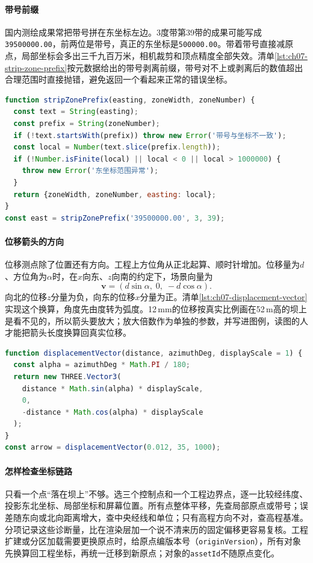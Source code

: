 \paragraph{带号前缀}国内测绘成果常把带号拼在东坐标左边。3度带第39带的成果可能写成\texttt{39500000.00}，前两位是带号，真正的东坐标是\texttt{500000.00}。带着带号直接减原点，局部坐标会多出三千九百万米，相机裁剪和顶点精度全部失效。清单\ref{lst:ch07-strip-zone-prefix}按元数据给出的带号剥离前缀，带号对不上或剥离后的数值超出合理范围时直接抛错，避免返回一个看起来正常的错误坐标。

\begin{lstlisting}[label={lst:ch07-strip-zone-prefix},language=JavaScript,breaklines=true,caption={剥离国内测绘成果的带号前缀}]
function stripZonePrefix(easting, zoneWidth, zoneNumber) {
  const text = String(easting);
  const prefix = String(zoneNumber);
  if (!text.startsWith(prefix)) throw new Error('带号与坐标不一致');
  const local = Number(text.slice(prefix.length));
  if (!Number.isFinite(local) || local < 0 || local > 1000000) {
    throw new Error('东坐标范围异常');
  }
  return {zoneWidth, zoneNumber, easting: local};
}
const east = stripZonePrefix('39500000.00', 3, 39);
\end{lstlisting}

\paragraph{位移箭头的方向}位移测点除了位置还有方向。工程上方位角从正北起算、顺时针增加。位移量为$d$、方位角为$\alpha$时，在$x$向东、$z$向南的约定下，场景向量为
\[
  \boldsymbol v=(d\sin\alpha,\;0,\;-d\cos\alpha).
\]
向北的位移$z$分量为负，向东的位移$x$分量为正。清单\ref{lst:ch07-displacement-vector}实现这个换算，角度先由度转为弧度。12\,mm的位移按真实比例画在52\,m高的坝上是看不见的，所以箭头要放大；放大倍数作为单独的参数，并写进图例，读图的人才能把箭头长度换算回真实位移。

\begin{lstlisting}[label={lst:ch07-displacement-vector},language=JavaScript,breaklines=true,caption={按北起顺时针方位角生成位移箭头向量}]
function displacementVector(distance, azimuthDeg, displayScale = 1) {
  const alpha = azimuthDeg * Math.PI / 180;
  return new THREE.Vector3(
    distance * Math.sin(alpha) * displayScale,
    0,
    -distance * Math.cos(alpha) * displayScale
  );
}
const arrow = displacementVector(0.012, 35, 1000);
\end{lstlisting}

\paragraph{怎样检查坐标链路}只看一个点“落在坝上”不够。选三个控制点和一个工程边界点，逐一比较经纬度、投影东北坐标、局部坐标和屏幕位置。所有点整体平移，先查局部原点或带号；误差随东向或北向距离增大，查中央经线和单位；只有高程方向不对，查高程基准。分项记录这些诊断量，比在渲染层加一个说不清来历的固定偏移更容易复核。工程扩建或分区加载需要更换原点时，给原点编版本号（\texttt{originVersion}），所有对象先换算回工程坐标，再统一迁移到新原点；对象的\texttt{assetId}不随原点变化。

